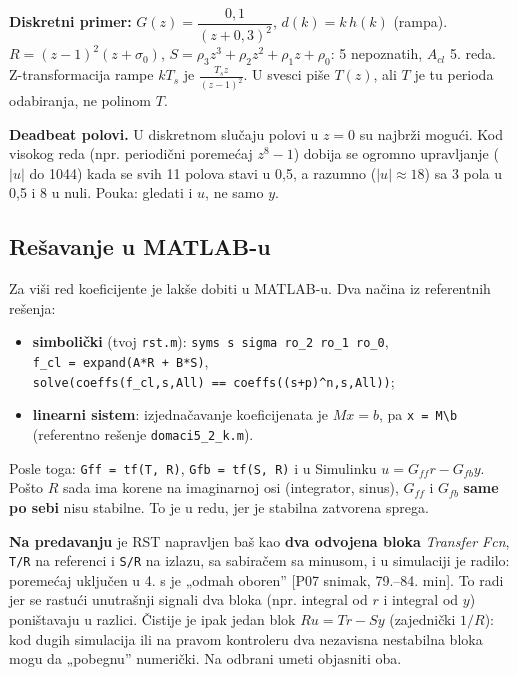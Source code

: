 \documentclass[11pt,a4paper,parskip=half,headsepline,numbers=noenddot]{scrartcl}
\DeclareRobustCommand{\izvor}[1]{{\small\color{izvorC}[#1]}}
\begin{document}
\textbf{Diskretni primer:} \(G(z) = \dfrac{0{,}1}{(z+0{,}3)^2}\), \(d(k) = k\,h(k)\) (rampa). \(R = (z-1)^2(z + \sigma_0)\), \(S = \rho_3z^3 + \rho_2z^2 + \rho_1z + \rho_0\): 5 nepoznatih, \(A_{cl}\) 5. reda. Z-transformacija rampe \(kT_s\) je \(\frac{T_sz}{(z-1)^2}\). U svesci piše \(T(z)\), ali \(T\) je tu perioda odabiranja, ne polinom \(T\).

\textbf{Deadbeat polovi.} U diskretnom slučaju polovi u \(z = 0\) su najbrži mogući. Kod visokog reda (npr. periodični poremećaj \(z^8 - 1\)) dobija se ogromno upravljanje (\(|u|\) do 1044) kada se svih 11 polova stavi u 0,5, a razumno (\(|u| \approx 18\)) sa 3 pola u 0,5 i 8 u nuli. Pouka: gledati i \(u\), ne samo \(y\).

\subsection{Rešavanje u MATLAB-u}

Za viši red koeficijente je lakše dobiti u MATLAB-u. Dva načina iz referentnih rešenja:

\begin{itemize}
\item \textbf{simbolički} (tvoj \texttt{rst.m}): \texttt{syms\ s\ sigma\ ro\_\allowbreak{}2\ ro\_\allowbreak{}1\ ro\_\allowbreak{}0}, \texttt{f\_\allowbreak{}cl\ =\ expand(\allowbreak{}A*R\ +\ B*S)}, \texttt{solve(\allowbreak{}coeffs(\allowbreak{}f\_\allowbreak{}cl,\allowbreak{}s,\allowbreak{}\textquotesingle{}All\textquotesingle{})\ ==\ coeffs(\allowbreak{}(\allowbreak{}s+p)\^{}n,\allowbreak{}s,\allowbreak{}\textquotesingle{}All\textquotesingle{}))};
\item \textbf{linearni sistem}: izjednačavanje koeficijenata je \(Mx = b\), pa \texttt{x\ =\ M\textbackslash{}b} (referentno rešenje \texttt{domaci5\_\allowbreak{}2\_\allowbreak{}k.m}).
\end{itemize}

Posle toga: \texttt{Gff\ =\ tf(\allowbreak{}T,\allowbreak{}\ R)}, \texttt{Gfb\ =\ tf(\allowbreak{}S,\allowbreak{}\ R)} i u Simulinku \(u = G_{ff}r - G_{fb}y\). Pošto \(R\) sada ima korene na imaginarnoj osi (integrator, sinus), \(G_{ff}\) i \(G_{fb}\) \textbf{same po sebi} nisu stabilne. To je u redu, jer je stabilna zatvorena sprega.

\textbf{Na predavanju} je RST napravljen baš kao \textbf{dva odvojena bloka} \emph{Transfer Fcn}, \texttt{T/R} na referenci i \texttt{S/R} na izlazu, sa sabiračem sa minusom, i u simulaciji je radilo: poremećaj uključen u 4. s je „odmah oboren'' \izvor{P07 snimak, 79.--84. min}. To radi jer se rastući unutrašnji signali dva bloka (npr. integral od \(r\) i integral od \(y\)) poništavaju u razlici. Čistije je ipak jedan blok \(R u = Tr - Sy\) (zajednički \(1/R\)): kod dugih simulacija ili na pravom kontroleru dva nezavisna nestabilna bloka mogu da „pobegnu'' numerički. Na odbrani umeti objasniti oba.
\end{document}
